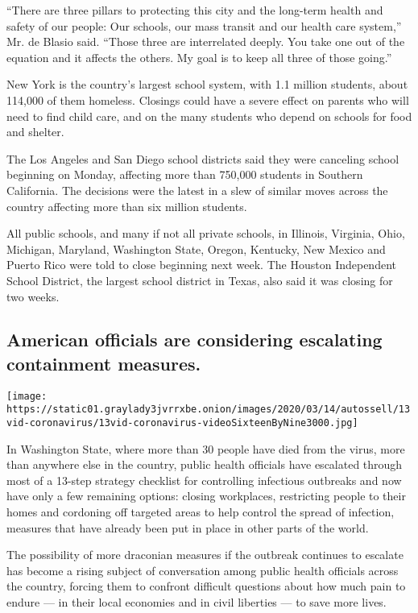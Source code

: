 ``There are three pillars to protecting this city and the long-term
health and safety of our people: Our schools, our mass transit and our
health care system,'' Mr. de Blasio said. ``Those three are interrelated
deeply. You take one out of the equation and it affects the others. My
goal is to keep all three of those going.''

New York is the country's largest school system, with 1.1 million
students, about 114,000 of them homeless. Closings could have a severe
effect on parents who will need to find child care, and on the many
students who depend on schools for food and shelter.

The Los Angeles and San Diego school districts said they were canceling
school beginning on Monday, affecting more than 750,000 students in
Southern California. The decisions were the latest in a slew of similar
moves across the country affecting more than six million students.

All public schools, and many if not all private schools, in Illinois,
Virginia, Ohio, Michigan, Maryland, Washington State, Oregon, Kentucky,
New Mexico and Puerto Rico were told to close beginning next week. The
Houston Independent School District, the largest school district in
Texas, also said it was closing for two weeks.

\hypertarget{american-officials-are-considering-escalating-containment-measures}{%
\subsection{American officials are considering escalating containment
measures.}\label{american-officials-are-considering-escalating-containment-measures}}

\texttt{[image: https://static01.graylady3jvrrxbe.onion/images/2020/03/14/autossell/13vid-coronavirus/13vid-coronavirus-videoSixteenByNine3000.jpg]}

In Washington State, where more than 30 people have died from the virus,
more than anywhere else in the country, public health officials have
escalated through most of a 13-step strategy checklist for controlling
infectious outbreaks and now have only a few remaining options: closing
workplaces, restricting people to their homes and cordoning off targeted
areas to help control the spread of infection, measures that have
already been put in place in other parts of the world.

The possibility of more draconian measures if the outbreak continues to
escalate has become a rising subject of conversation among public health
officials across the country, forcing them to confront difficult
questions about how much pain to endure --- in their local economies and
in civil liberties --- to save more lives.

